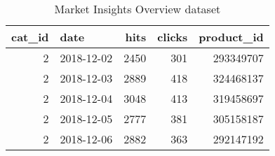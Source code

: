 \begin{table}[h]
\centering
\caption{Market Insights Overview dataset}
\label{table:market_insights_overview_11-12-21}
\begin{tabular}{rlrrr}
\toprule
 cat\_id &       date &  hits &  clicks &  product\_id \\
\midrule
      2 & 2018-12-02 &  2450 &     301 &   293349707 \\
      2 & 2018-12-03 &  2889 &     418 &   324468137 \\
      2 & 2018-12-04 &  3048 &     413 &   319458697 \\
      2 & 2018-12-05 &  2777 &     381 &   305158187 \\
      2 & 2018-12-06 &  2882 &     363 &   292147192 \\
\bottomrule
\end{tabular}
\end{table}
